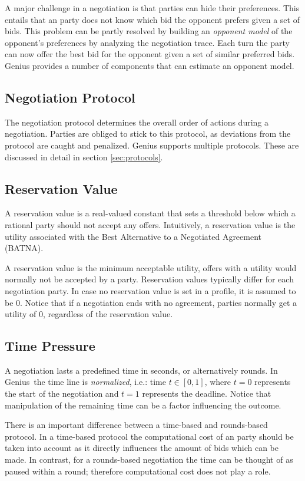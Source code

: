\documentclass[]{article}
\newcommand\Genius{{\sc Genius}}
\begin{document}
A major challenge in a negotiation is that parties can hide their preferences. This entails that an party does not know which bid the opponent prefers given a set of bids. This problem can be partly resolved by building an \textit{opponent model} of the opponent's preferences by analyzing the negotiation trace. Each turn the party can now offer the best bid for the opponent given a set of similar preferred bids. {\Genius}  provides a number of components that can estimate an opponent model.

\subsection{Negotiation Protocol}
The negotiation protocol determines the overall order of actions during a negotiation. Parties are obliged to stick to this protocol, as deviations from the protocol are caught and penalized. {\Genius} supports multiple protocols. These are discussed in detail in section \ref{sec:protocols}.

 
\subsection{Reservation Value}
A reservation value is a real-valued constant that sets a threshold below which a rational party should not accept any offers. Intuitively, a reservation value is the utility associated with the Best Alternative to a Negotiated Agreement (BATNA).

A reservation value is the minimum acceptable utility, offers with a utility would normally not be accepted by a party. Reservation values typically differ for each negotiation party. In case no reservation value is set in a profile, it is assumed to be 0. Notice that if a negotiation ends with no agreement, parties normally get a utility of 0, regardless of the reservation value.

\subsection{Time Pressure}
A negotiation lasts a predefined time in seconds, or alternatively rounds. In {\Genius}~the time line is \emph{normalized}, i.e.: time $t \in [0, 1]$, where $t = 0$ represents the start of the negotiation and $t = 1$ represents the deadline. Notice that manipulation of the remaining time can be a factor influencing the outcome.

There is an important difference between a time-based and rounds-based protocol. In a time-based protocol the computational cost of an party should be taken into account as it directly influences the amount of bids which can be made. In contrast, for a rounds-based negotiation the time can be thought of as paused within a round; therefore computational cost does not play a role.
\end{document}
